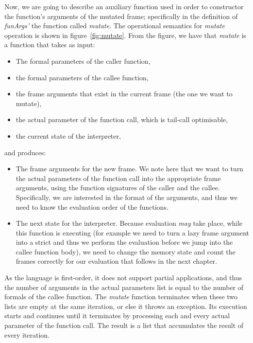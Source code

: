 \documentclass[diploma]{softlab-thesis}
\begin{document}
Now, we are going to describe an auxiliary function used in order to constructor 
the function's arguments of the mutated frame; specifically in the definition of 
\textit{funArgs'} the function called \textit{mutate}.
The operational semantics for \textit{mutate} operation is shown in figure~\ref{fig:mutate}.
From the figure, we have that \textit{mutate} is a function that takes as input:
\begin{itemize}
  \item The formal parameters of the caller function,
  \item the formal parameters of the callee function,
  \item the frame arguments that exist in the current frame (the one we want to mutate),
  \item the actual parameter of the function call, which is tail-call optimisable,
  \item the current state of the interpreter, 
\end{itemize}
and produces:
\begin{itemize}
  \item The frame arguments for the new frame. We note here that we want to turn the actual parameters 
  of the function call into the appropriate frame arguments, using the function signatures of the caller and the callee.
  Specifically, we are interested in the format of the arguments, and thus we need to know the evaluation 
  order of the functions.
  \item The next state for the interpreter. Because evaluation \textit{may} take place, while this function is executing 
  (for example we need to turn a lazy frame argument into a strict and thus we perform the evaluation before 
  we jump into the callee function body), we need to change the memory state and count the frames correctly
  for our evaluation that follows in the next chapter.
\end{itemize}

As the language is first-order, it does not support partial applications, and thus the number of arguments 
in the actual parameters list is equal to the number of formals of the callee function. The \textit{mutate} function 
terminates when these two lists are empty at the same iteration, or else it throws an exception. Its execution starts 
and continues until it terminates by processing each and every actual parameter of the function call. The result is 
a list that accumulates the result of every iteration. 
\end{document}
